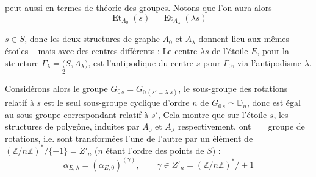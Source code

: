 peut aussi   en termes de théorie des groupes. Notons que l'on aura alors
\[
\operatorname{Et}_{A_0}(s)=\operatorname{Et}_{A_\lambda}(\lambda s)\tag*{(26)}
\]


$s\in S$, donc les deux structures de graphe $A_0$ et $A_\lambda$ donnent lieu aux mêmes étoiles -- mais avec des centres différents : Le centre $\lambda s$ de l'étoile $E$, pour la structure $\Gamma_\lambda=\underset{2}{(}S,A_\lambda)$, est l'antipodique du centre $s$ pour $\Gamma_0$, via l'antipodisme $\lambda$.

Considérons alors le groupe $G_{0\,s}=G_{0\,(s'=\lambda.s)}$,  le sous-groupe des rotations relatif à  $s$ est le seul sous-groupe cyclique d'ordre $n$ de $G_{0\,s}\simeq\mathbb D_n$, donc est égal au sous-groupe correspondant  relatif à $s'$, Cela montre que sur l'étoile $s$, les structures de polygône, induites par $A_0$ et $A_\lambda$ respectivement, ont $=$ groupe de rotations, i.e. sont transformées l'une de l'autre par un élément \inserted{$\gamma$} de $(\mathbb Z/n\mathbb Z)^*/\{\pm1\}=Z'_n$ ($n$ étant l'ordre des points de $S$) :
\[
\alpha_{E,\lambda}=(\alpha_{E,0})^{(\gamma)},\qquad\gamma\in Z'_n=(\mathbb Z/n\mathbb Z)^*/\pm1\tag*{(27)}
\]

